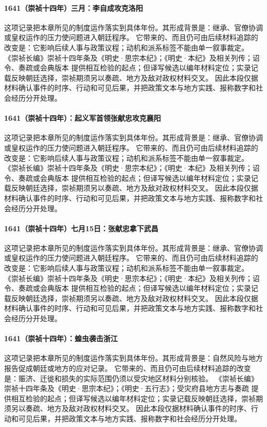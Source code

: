 \paragraph{1641（崇祯十四年）三月：李自成攻克洛阳} 这项记录把本章所见的制度运作落实到具体年份。其形成背景是：继承、官僚协调或皇权运作的压力使问题进入朝廷程序。 它带来的、而且仍可由后续材料追踪的改变是：它影响后续人事与政策议程；动机和派系标签不能由单一叙事裁定。 《崇祯长编》崇祯十四年条及《明史·思宗本纪》；《明史·本纪》及相关列传；诏令、奏疏或会典版本 提供相互检验的起点；但译写候选以编年材料定位；实录记载反映朝廷选择，崇祯期须另以奏疏、地方及敌对政权材料交叉。 因此本段仅据材料确认事件的时序、行动和可见后果，并把政策文本与地方实践、报称数字和社会经历分开处理。

\paragraph{1641（崇祯十四年）：起义军首领张献忠攻克襄阳} 这项记录把本章所见的制度运作落实到具体年份。其形成背景是：继承、官僚协调或皇权运作的压力使问题进入朝廷程序。 它带来的、而且仍可由后续材料追踪的改变是：它影响后续人事与政策议程；动机和派系标签不能由单一叙事裁定。 《崇祯长编》崇祯十四年条及《明史·思宗本纪》；《明史·本纪》及相关列传；诏令、奏疏或会典版本 提供相互检验的起点；但译写候选以编年材料定位；实录记载反映朝廷选择，崇祯期须另以奏疏、地方及敌对政权材料交叉。 因此本段仅据材料确认事件的时序、行动和可见后果，并把政策文本与地方实践、报称数字和社会经历分开处理。

\paragraph{1641（崇祯十四年）七月15日：张献忠拿下武昌} 这项记录把本章所见的制度运作落实到具体年份。其形成背景是：继承、官僚协调或皇权运作的压力使问题进入朝廷程序。 它带来的、而且仍可由后续材料追踪的改变是：它影响后续人事与政策议程；动机和派系标签不能由单一叙事裁定。 《崇祯长编》崇祯十四年条及《明史·思宗本纪》；《明史·本纪》及相关列传；诏令、奏疏或会典版本 提供相互检验的起点；但译写候选以编年材料定位；实录记载反映朝廷选择，崇祯期须另以奏疏、地方及敌对政权材料交叉。 因此本段仅据材料确认事件的时序、行动和可见后果，并把政策文本与地方实践、报称数字和社会经历分开处理。

\paragraph{1641（崇祯十四年）：蝗虫袭击浙江} 这项记录把本章所见的制度运作落实到具体年份。其形成背景是：自然风险与地方报告促成朝廷或地方的应对记录。 它带来的、而且仍可由后续材料追踪的改变是：赈济、迁徙和损失的实际范围仍须以受灾地区材料分别核验。 《崇祯长编》崇祯十四年条及《明史·思宗本纪》；《明史·五行志》；受灾府县地方志与奏疏 提供相互检验的起点；但译写候选以编年材料定位；实录记载反映朝廷选择，崇祯期须另以奏疏、地方及敌对政权材料交叉。 因此本段仅据材料确认事件的时序、行动和可见后果，并把政策文本与地方实践、报称数字和社会经历分开处理。


